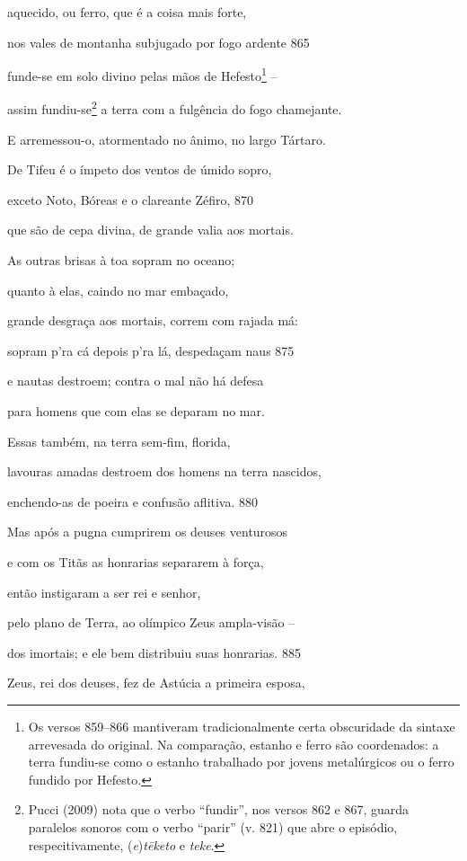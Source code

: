 aquecido, ou ferro, que é a coisa mais forte,

nos vales de montanha subjugado por fogo ardente \num{865}

funde-se em solo divino pelas mãos de Hefesto\footnote{Os versos 859--866 mantiveram tradicionalmente certa obscuridade da sintaxe arrevesada do original. Na comparação, estanho e ferro são coordenados: a terra
fundiu-se como o estanho trabalhado por jovens metalúrgicos ou o ferro
fundido por Hefesto.} --

assim fundiu-se\footnote{Pucci (2009) nota que o verbo ``fundir'', nos versos 862 e 867, guarda paralelos sonoros com o verbo ``parir'' (v. 821) que abre o
episódio, respecitivamente, (\emph{e})\emph{tēketo} e \emph{teke}.} a terra com a fulgência do fogo chamejante.

E arremessou-o, atormentado no ânimo, no largo Tártaro.

\quad{}De Tifeu é o ímpeto dos ventos de úmido sopro,

exceto Noto, Bóreas e o clareante Zéfiro, \num{870}

que são de cepa divina, de grande valia aos mortais.

As outras brisas à toa sopram no oceano;

quanto à elas, caindo no mar embaçado,

grande desgraça aos mortais, correm com rajada má:

sopram p'ra cá depois p'ra lá, despedaçam naus \num{875}

e nautas destroem; contra o mal não há defesa

para homens que com elas se deparam no mar.

Essas também, na terra sem-fim, florida,

lavouras amadas destroem dos homens na terra nascidos,

enchendo-as de poeira e confusão aflitiva. \num{880}

\medskip

Mas após a pugna cumprirem os deuses venturosos

e com os Titãs as honrarias separarem à força,

então instigaram a ser rei e senhor,

pelo plano de Terra, ao olímpico Zeus ampla-visão --

dos imortais; e ele bem distribuiu suas honrarias. \num{885}

\quad{}Zeus, rei dos deuses, fez de Astúcia a primeira esposa,

